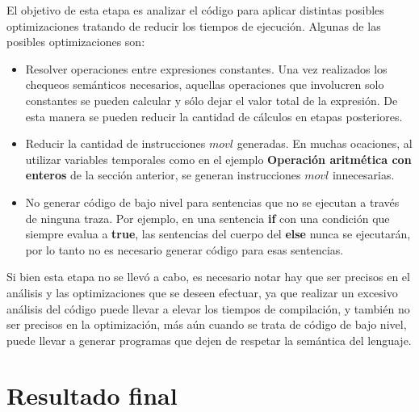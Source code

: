 \documentclass[11pt,a4paper]{article}
\begin{document}
El objetivo de esta etapa es analizar el código para aplicar distintas posibles optimizaciones tratando de reducir los tiempos de ejecución. Algunas de las posibles optimizaciones son:
\begin{itemize}
	\item Resolver operaciones entre expresiones constantes. Una vez realizados los chequeos semánticos necesarios, aquellas operaciones que involucren solo constantes se pueden calcular y sólo dejar el valor total de la expresión. De esta manera se pueden reducir la cantidad de cálculos en etapas posteriores.
	\item Reducir la cantidad de instrucciones $movl$ generadas. En muchas ocaciones, al utilizar variables temporales como en el ejemplo \textbf{Operación aritmética con enteros} de la sección anterior, se generan instrucciones $movl$ innecesarias. 
	\item No generar código de bajo nivel para sentencias que no se ejecutan a través de ninguna traza. Por ejemplo, en una sentencia \textbf{if} con una condición que siempre evalua a \textbf{true}, las sentencias del cuerpo del \textbf{else} nunca se ejecutarán, por lo tanto no es necesario generar código para esas sentencias.
\end{itemize}

Si bien esta etapa no se llevó a cabo, es necesario notar hay que ser precisos en el análisis y las optimizaciones que se deseen efectuar, ya que realizar un excesivo análisis del código puede llevar a elevar los tiempos de compilación, y también no ser precisos en la optimización, más aún cuando se trata de código de bajo nivel, puede llevar a generar programas que dejen de respetar la semántica del lenguaje. 

\section{Resultado final} 
\label{sec:concl}
\end{document}
